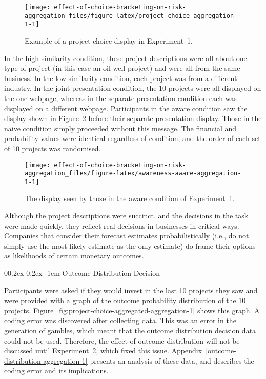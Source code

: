 \documentclass[
  english,
  man, donotrepeattitle,floatsintext]{apa7}
\makeatletter
\let\oldparagraph\paragraph
\renewcommand{\paragraph}[1]{\oldparagraph{#1}\mbox{}}
\renewcommand{\paragraph}{\@startsection{paragraph}{4}{\parindent}%
  {0\baselineskip \@plus 0.2ex \@minus 0.2ex}%
  {-1em}%
  {\normalfont\normalsize\bfseries\itshape\typesectitle}}
\theoremstyle{definition}
\theoremstyle{definition}
\theoremstyle{definition}
\theoremstyle{definition}
\theoremstyle{remark}
\makeatother
\begin{document}
\begin{figure}
\texttt{[image: effect-of-choice-bracketing-on-risk-aggregation\_files/figure-latex/project-choice-aggregation-1-1]} \caption{Example of a project choice display in Experiment~1.}\label{fig:project-choice-aggregation-1}
\end{figure}

In the high similarity condition, these project descriptions were all about one
type of project (in this case an oil well project) and were all from the same
business. In the low similarity condition, each project was from a different
industry. In the joint presentation condition, the 10 projects were all
displayed on the one webpage, whereas in the separate presentation condition
each was displayed on a different webpage. Participants in the aware condition
saw the display shown in Figure~\ref{fig:awareness-aware-aggregation-1} before
their separate presentation display. Those in the naive condition simply
proceeded without this message. The financial and probability values were
identical regardless of condition, and the order of each set of 10 projects was
randomised.



\begin{figure}
\texttt{[image: effect-of-choice-bracketing-on-risk-aggregation\_files/figure-latex/awareness-aware-aggregation-1-1]} \caption{The display seen by those in the aware condition of Experiment~1.}\label{fig:awareness-aware-aggregation-1}
\end{figure}

Although the project descriptions were succinct, and the decisions in the task
were made quickly, they reflect real decisions in businesses in critical ways.
Companies that consider their forecast estimates probabilistically (i.e., do not
simply use the most likely estimate as the only estimate) do frame their options
as likelihoods of certain monetary outcomes.

\hypertarget{outcome-distribution-materials-aggregation-1}{%
\paragraph{Outcome Distribution Decision}\label{outcome-distribution-materials-aggregation-1}}

Participants were asked if they would invest in the last 10 projects they saw
and were provided with a graph of the outcome probability distribution of the 10
projects. Figure~\ref{fig:project-choice-aggregated-aggregation-1} shows this
graph. A coding error was discovered after collecting data. This was an error in
the generation of gambles, which meant that the outcome distribution decision
data could not be used. Therefore, the effect of outcome distribution will not
be discussed until Experiment~2, which fixed this issue.
Appendix~\ref{outcome-distribution-aggregation-1} presents an analysis of these
data, and describes the coding error and its implications.
\end{document}

